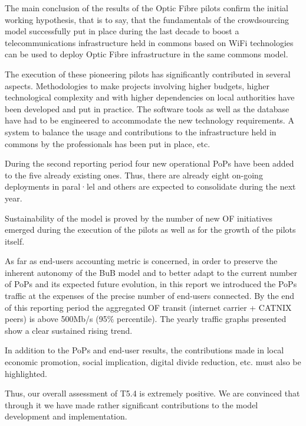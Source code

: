 The main conclusion of the results of the Optic Fibre pilots confirm the initial working hypothesis, that is to say, that the fundamentals of the crowdsourcing model successfully put in place during the last decade to boost a telecommunications infrastructure held in commons based on WiFi technologies can be used to deploy Optic Fibre infrastructure in the same commons model.

The execution of these pioneering pilots has significantly contributed in several aspects. Methodologies to make projects involving higher budgets, higher technological complexity and with higher dependencies on local authorities have been developed and put in practice. The software tools as well as the database have had to be engineered to accommodate the new technology requirements. A system to balance the usage and contributions to the infrastructure held in commons by the professionals has been put in place, etc.

During the second reporting period four new operational PoPs have been added to the five already existing ones. Thus, there are already eight on-going deployments in paral·lel and others are expected to consolidate during the next year.

Sustainability of the model is proved by the number of new OF initiatives emerged during the execution of the pilots as well as for the growth of the pilots itself.


As far as end-users accounting metric is concerned, in order to preserve the inherent autonomy of the BuB model and to better adapt to the current number of PoPs and its expected future evolution, in this report we introduced the PoPs traffic at the expenses of the precise number of end-users connected. By the end of this reporting period the aggregated OF transit (internet carrier + CATNIX peers) is above 500Mb/s (95\% percentile). The yearly traffic graphs presented show a clear sustained rising trend. 

In addition to the PoPs and end-user results, the contributions made in local economic promotion, social implication, digital divide reduction, etc. must also be highlighted.

Thus, our overall assessment of T5.4 is extremely positive. We are convinced that through it we have made rather significant contributions to the model development and implementation.
